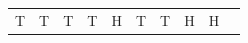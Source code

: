 {\begin{tabular}[t]{|l|l|l|l|l|l|l|l|l|l|}
        T &
    
    
        T &
    
    
        T &
    
    
        T &
    
    
        H &
    
    
        T &
    
    
        T &
    
    
        H &
    
    
        H%
     \tabularnewline\cline{1-1}\cline{2-2}\cline{3-3}\cline{4-4}\cline{5-5}\cline{6-6}\cline{7-7}\cline{8-8}\cline{9-9}\cline{10-10}
    

\end{tabular}}
